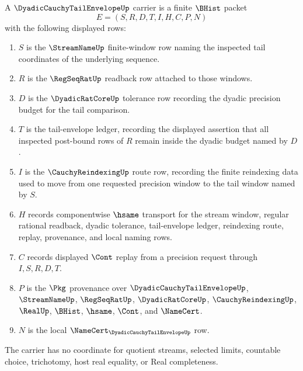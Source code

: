 \begin{definition}
\label{def:dyadic-cauchy-tail-envelope-carrier}
A $\DyadicCauchyTailEnvelopeUp$ carrier is a finite $\BHist$ packet
$$
E=(S,R,D,T,I,H,C,P,N)
$$
with the following displayed rows:
\begin{enumerate}
\item $S$ is the $\StreamNameUp$ finite-window row naming the inspected tail coordinates of the underlying sequence.
\item $R$ is the $\RegSeqRatUp$ readback row attached to those windows.
\item $D$ is the $\DyadicRatCoreUp$ tolerance row recording the dyadic precision budget for the tail comparison.
\item $T$ is the tail-envelope ledger, recording the displayed assertion that all inspected post-bound rows of $R$ remain inside the dyadic budget named by $D$.
\item $I$ is the $\CauchyReindexingUp$ route row, recording the finite reindexing data used to move from one requested precision window to the tail window named by $S$.
\item $H$ records componentwise $\hsame$ transport for the stream window, regular rational readback, dyadic tolerance, tail-envelope ledger, reindexing route, replay, provenance, and local naming rows.
\item $C$ records displayed $\Cont$ replay from a precision request through $I,S,R,D,T$.
\item $P$ is the $\Pkg$ provenance over $\DyadicCauchyTailEnvelopeUp$, $\StreamNameUp$, $\RegSeqRatUp$, $\DyadicRatCoreUp$, $\CauchyReindexingUp$, $\RealUp$, $\BHist$, $\hsame$, $\Cont$, and $\NameCert$.
\item $N$ is the local $\NameCert_{\DyadicCauchyTailEnvelopeUp}$ row.
\end{enumerate}
The carrier has no coordinate for quotient streams, selected limits, countable choice, trichotomy, host real equality, or Real completeness.
\end{definition}

